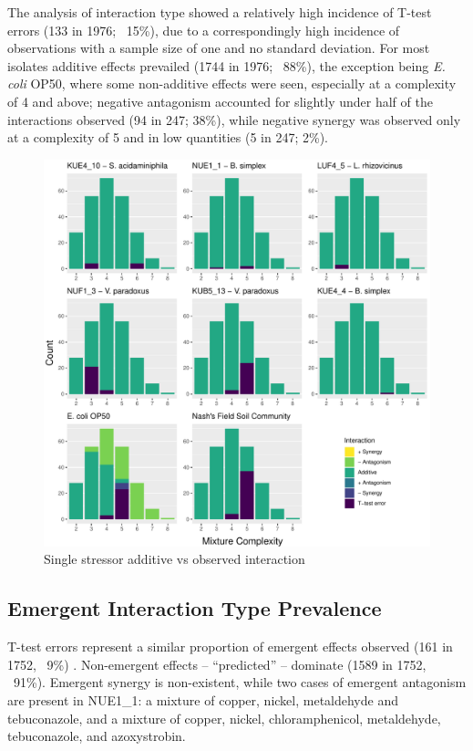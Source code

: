 \documentclass[final,1p,times]{elsarticle}
\begin{document}
The analysis of interaction type showed a relatively high incidence of T-test errors (133 in 1976; ~15\%), due to a correspondingly high incidence of observations with a sample size of one and no standard deviation. For most isolates additive effects prevailed (1744 in 1976; ~88\%), the exception being \textit{E. coli} OP50, where some non-additive effects were seen, especially at a complexity of 4 and above; negative antagonism accounted for slightly under half of the interactions observed (94 in 247; 38\%), while negative synergy was observed only at a complexity of 5 and in low quantities (5 in 247; 2\%).

\begin{figure}[hb]
    \centering
    \includegraphics[width = \textwidth]{Scripts/Results/Final_Pipeline/histogram_interaction_basic.pdf}
    \caption{Single stressor additive vs observed interaction}
    \label{fig:histogram_interaction_basic}
\end{figure}

\newpage
\subsection{Emergent Interaction Type Prevalence}
\label{S:3:8}

T-test errors represent a similar proportion of emergent effects observed (161 in 1752, ~9\%) . Non-emergent effects – “predicted” – dominate (1589 in 1752, ~91\%). Emergent synergy is non-existent, while two cases of emergent antagonism are present in NUE1\_1: a mixture of copper, nickel, metaldehyde and tebuconazole, and a mixture of copper, nickel, chloramphenicol, metaldehyde, tebuconazole, and azoxystrobin.
\end{document}

